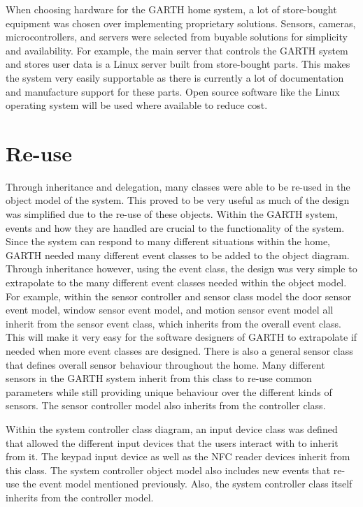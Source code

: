 \documentclass{report}
\begin{document}
When choosing hardware for the GARTH home system, a lot of store-bought
equipment was chosen over implementing proprietary solutions. Sensors, cameras,
microcontrollers, and servers were selected from buyable solutions for
simplicity and availability. For example, the main server that controls the GARTH
system and stores user data is a Linux server built from store-bought parts.
This makes the system very easily supportable as there is currently a lot of
documentation and manufacture support for these parts. Open source software
like the Linux operating system will be used where available to reduce cost.

\section{Re-use}

Through inheritance and delegation, many classes were able to be re-used in the
object model of the system. This proved to be very useful as much of the design
was simplified due to the re-use of these objects. Within the GARTH system,
events and how they are handled are crucial to the functionality of the system.
Since the system can respond to many different situations within the home, 
GARTH needed many different event classes to be added to the object diagram.
Through inheritance however, using the event class, the design was very simple
to extrapolate to the many different event classes needed within the object
model. For example, within the sensor controller and sensor class model the door
sensor event model, window sensor event model, and motion sensor event model
all inherit from the sensor event class, which inherits from the overall event
class. This will make it very easy for the software designers of GARTH to
extrapolate if needed when more event classes are designed. There is also a 
general sensor class that defines overall sensor behaviour throughout the home.
Many different sensors in the GARTH system inherit from this class to re-use
common parameters while still providing unique behaviour over the different
kinds of sensors. The sensor controller model also inherits from the controller
class.

Within the system controller class diagram, an input device class was defined
that allowed the different input devices that the users interact with to inherit
from it. The keypad input device as well as the NFC reader devices inherit
from this class. The system controller object model also includes new events
that re-use the event model mentioned previously. Also, the system controller
class itself inherits from the controller model.
\end{document}
